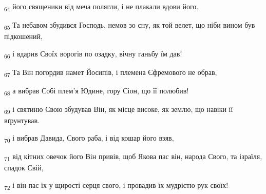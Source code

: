 \begin{tcolorbox}
\textsubscript{64} його священики від меча полягли, і не плакали вдови його.
\end{tcolorbox}
\begin{tcolorbox}
\textsubscript{65} Та небавом збудився Господь, немов зо сну, як той велет, що ніби вином був підкошений,
\end{tcolorbox}
\begin{tcolorbox}
\textsubscript{66} і вдарив Своїх ворогів по озадку, вічну ганьбу їм дав!
\end{tcolorbox}
\begin{tcolorbox}
\textsubscript{67} Та Він погордив намет Йосипів, і племена Єфремового не обрав,
\end{tcolorbox}
\begin{tcolorbox}
\textsubscript{68} а вибрав Собі плем'я Юдине, гору Сіон, що її полюбив!
\end{tcolorbox}
\begin{tcolorbox}
\textsubscript{69} і святиню Свою збудував Він, як місце високе, як землю, що навіки її вґрунтував.
\end{tcolorbox}
\begin{tcolorbox}
\textsubscript{70} і вибрав Давида, Свого раба, і від кошар його взяв,
\end{tcolorbox}
\begin{tcolorbox}
\textsubscript{71} від кітних овечок його Він привів, щоб Якова пас він, народа Свого, та ізраїля, спадок Свій,
\end{tcolorbox}
\begin{tcolorbox}
\textsubscript{72} і він пас їх у щирості серця свого, і провадив їх мудрістю рук своїх!
\end{tcolorbox}
